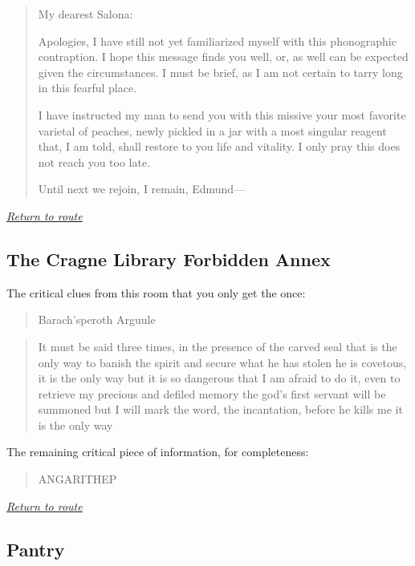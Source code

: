 \documentclass[a5paper]{extarticle}
\begin{document}
\begin{quote}
My dearest Salona:

Apologies, I have still not yet familiarized myself
with this phonographic contraption. I hope this message finds you well, or, as well can be
expected given the circumstances. I must be brief, as I am not certain to tarry long in this fearful
place.

I have instructed my man to send you with this missive your most favorite varietal of
peaches, newly pickled in a jar with a most singular reagent that, I am told, shall restore to you
life and vitality. I only pray this does not reach you too late.

Until next we rejoin, I remain, Edmund---
\end{quote}

\hyperref[sec:route-7]{\emph{Return to route}}

\newpage
\subsection{The Cragne Library Forbidden Annex}\label{sec:nb-Cragne-Library-Forbidden-Annex}

The critical clues from this room that you only get the once:

\vfill
\begin{quote}
Barach’speroth Arguule
\end{quote}

\vfill
\begin{quote}
It must be said three times, in the presence of the carved seal\xelip
that is the only way to banish the spirit and secure what he has stolen\xelip
he is covetous, it is the only way\xelip
but it is so dangerous that I am afraid to do it,
even to retrieve my precious and defiled memory\xelip
the god’s first servant will be summoned\xelip
but I will mark the word, the incantation, before he kills me\xelip
it is the only way\xelip
\end{quote}

\vfill
The remaining critical piece of information, for completeness:
\begin{quote}
ANGARITHEP
\end{quote}

\vfill
\hyperref[sec:route-8]{\emph{Return to route}}

\newpage
\subsection{Pantry}\label{sec:nb-Pantry}
\end{document}
